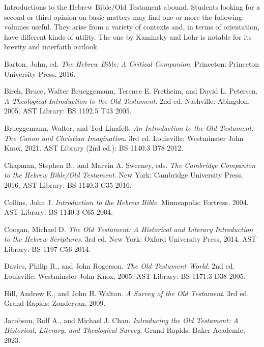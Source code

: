 \documentclass[titlepage]{article}
\begin{document}
Introductions to the Hebrew Bible/Old Testament abound. Students looking
for a second or third opinion on basic matters may find one or more the
following volumes useful. They arise from a variety of contexts and, in
terms of orientation, have different kinds of utility. The one by
Kaminsky and Lohr \cite{hbfb} is notable for its brevity and interfaith
outlook.

\begingroup
\renewcommand{\section}[2]{}%
\begin{thebibliography}{99}%

	 Barton, John, ed.
	\emph{The Hebrew Bible: A Critical Companion}.
	Princeton: Princeton University Press, 2016.

	 Birch, Bruce, Walter Brueggemann, Terence E. Fretheim, and David L. Petersen.
	\emph{A Theological Introduction to the Old Testament}.
	2nd ed. Nashville: Abingdon, 2005.
	AST Library: BS 1192.5 T43 2005.

	 Brueggemann, Walter, and Tod Linafelt.
	\emph{An Introduction to the Old Testament: The Canon and Christian Imagination}.
	3rd ed. Louisville: Westminster John Knox, 2021.
	AST Library (2nd ed.): BS 1140.3 B78 2012.

	 Chapman, Stephen B., and Marvin A. Sweeney, eds.
	\emph{The Cambridge Companion to the Hebrew Bible/Old Testament}.
	New York: Cambridge University Press, 2016.
	AST Library: BS 1140.3 C35 2016.

	 Collins, John J.
	\emph{Introduction to the Hebrew Bible}.
	Minneapolis: Fortress, 2004.
	AST Library: BS 1140.3 C65 2004.

	 Coogan, Michael D.
	\emph{The Old Testament: A Historical and Literary Introduction to the Hebrew Scriptures}.
	3rd ed. New York: Oxford University Press, 2014.
	AST Library: BS 1197 C56 2014.

	 Davies, Philip R., and John Rogerson.
	\emph{The Old Testament World}.
	2nd ed. Louisville: Westminster John Knox, 2005.
	AST Library: BS 1171.3 D38 2005.

	 Hill, Andrew E., and John H. Walton.
	\emph{A Survey of the Old Testament}.
	3rd ed. Grand Rapids: Zondervan, 2009.

	 Jacobson, Rolf A., and Michael J. Chan.
	\emph{Introducing the Old Testament: A Historical, Literary, and Theological Survey}.
	Grand Rapids: Baker Academic, 2023.


\end{thebibliography}
\end{document}
